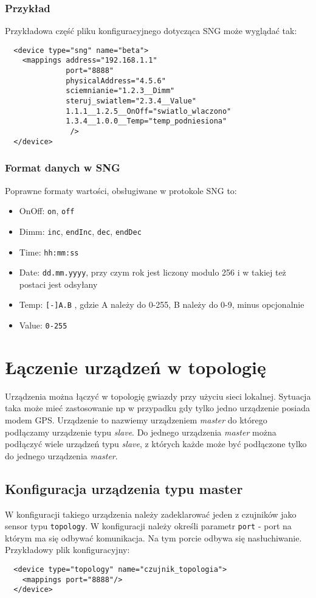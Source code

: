 \documentclass[11pt]{article}
\begin{document}
\subsubsection{Przykład}
Przykładowa część pliku konfiguracyjnego dotycząca SNG może wyglądać tak:
\begin{verbatim}
  <device type="sng" name="beta">
    <mappings address="192.168.1.1"
              port="8888"
              physicalAddress="4.5.6"
              sciemnianie="1.2.3__Dimm"
              steruj_swiatlem="2.3.4__Value"
              1.1.1__1.2.5__OnOff="swiatlo_wlaczono"
              1.3.4__1.0.0__Temp="temp_podniesiona"
               />
  </device>
\end{verbatim}

\subsubsection{Format danych w SNG}
Poprawne formaty wartości, obsługiwane w protokole SNG to:
\begin{itemize}

\item OnOff: \verb|on|, \verb|off|
\item Dimm: \verb|inc|, \verb|endInc|, \verb|dec|, \verb|endDec|
\item Time: \verb|hh:mm:ss|
\item Date: \verb|dd.mm.yyyy|, przy czym rok jest liczony modulo 256 i w takiej też postaci jest odsyłany
\item Temp: \verb|[-]A.B| , gdzie A należy do 0-255, B należy do 0-9,  minus opcjonalnie
\item Value: \verb|0-255| 
\end{itemize}


\section{Łączenie urządzeń w topologię}
Urządzenia można łączyć w topologię gwiazdy przy użyciu sieci lokalnej. Sytuacja taka może mieć zastosowanie np w przypadku
gdy tylko jedno urządzenie posiada modem GPS. Urządzenie to nazwiemy urządzeniem \textit{master} do którego podłączamy urządzenie typu
\textit{slave}. Do jednego urządzenia \textit{master} można podłączyć wiele urządzeń typu \textit{slave}, z których każde może być podłączone
tylko do jednego urządzenia \textit{master}.

\subsection{Konfiguracja urządzenia typu master}
W konfiguracji takiego urządzenia należy zadeklarować jeden z czujników jako sensor typu \verb|topology|. W konfiguracji
należy określi parametr \verb|port| - port na którym ma się odbywać komunikacja. Na tym porcie odbywa się nasłuchiwanie.
Przykładowy plik konfiguracyjny:
\begin{verbatim}
  <device type="topology" name="czujnik_topologia">
    <mappings port="8888"/>
  </device>
\end{verbatim}
\end{document}
